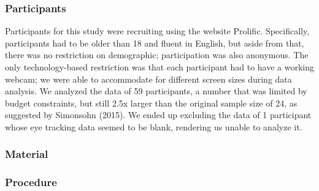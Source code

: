\documentclass[
  english,
  man]{apa6}
\begin{document}
\hypertarget{participants-1}{%
\subsubsection{Participants}\label{participants-1}}

Participants for this study were recruiting using the website Prolific. Specifically, participants had to be older than 18 and fluent in English, but aside from that, there was no restriction on demographic; participation was also anonymous. The only technology-based restriction was that each participant had to have a working webcam; we were able to accommodate for different screen sizes during data analysis. We analyzed the data of 59 participants, a number that was limited by budget constraints, but still 2.5x larger than the original sample size of 24, as suggested by Simonsohn (2015). We ended up excluding the data of 1 participant whose eye tracking data seemed to be blank, rendering us unable to analyze it.

\hypertarget{material}{%
\subsubsection{Material}\label{material}}

\hypertarget{procedure-1}{%
\subsubsection{Procedure}\label{procedure-1}}
\end{document}
